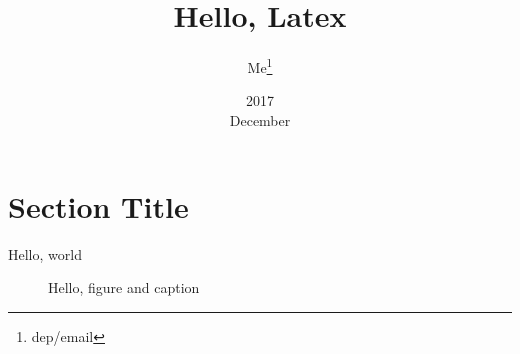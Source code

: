 \documentclass[12pt, a4paper]
{article}
\title{Hello, Latex}
\date{2017\\ December}
\author{Me\thanks{dep/email}  }
\begin{document}
\maketitle
\section{Section Title}
Hello, world

\begin{figure}[H]
\centering

\label{fig:qr}
\caption{Hello, figure and caption}
\end{figure}
\end{document}
